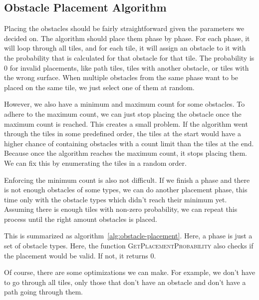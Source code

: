 \subsection{Obstacle Placement Algorithm}

Placing the obstacles should be fairly straightforward given the parameters we decided on.
The algorithm should place them phase by phase.
For each phase, it will loop through all tiles, and for each tile, it will assign an obstacle to it with the probability that is calculated for that obstacle for that tile.
The probability is 0 for invalid placements, like path tiles, tiles with another obstacle, or tiles with the wrong surface.
When multiple obstacles from the same phase want to be placed on the same tile, we just select one of them at random.

However, we also have a minimum and maximum count for some obstacles.
To adhere to the maximum count, we can just stop placing the obstacle once the maximum count is reached.
This creates a small problem.
If the algorithm went through the tiles in some predefined order, the tiles at the start would have a higher chance of containing obstacles with a count limit than the tiles at the end.
Because once the algorithm reaches the maximum count, it stops placing them.
We can fix this by enumerating the tiles in a random order.

Enforcing the minimum count is also not difficult.
If we finish a phase and there is not enough obstacles of some types, we can do another placement phase, this time only with the obstacle types which didn't reach their minimum yet.
Assuming there is enough tiles with non-zero probability, we can repeat this process until the right amount obstacles is placed.

This is summarized as algorithm~\ref{alg:obstacle-placement}.
Here, a phase is just a set of obstacle types.
Here, the function \textsc{GetPlacementProbability} also checks if the placement would be valid.
If not, it returns 0.

Of course, there are some optimizations we can make.
For example, we don't have to go through all tiles, only those that don't have an obstacle and don't have a path going through them.

